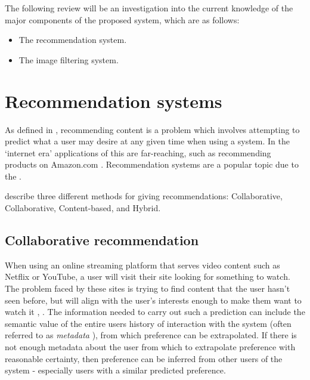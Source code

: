 \documentclass[a4paper,12pt]{report}
\begin{document}
  The following review will be an investigation into the current knowledge of the major components of the proposed system, which are as follows:

  \begin{itemize}
    \item The recommendation system.
    \item The image filtering system.
  \end{itemize}

  \section{Recommendation systems} \label{sec:lit-recc}
    As defined in \cite{ricci2011introduction}, recommending content is a problem which involves attempting to predict what a user may desire at any given time when using a system. In the ‘internet era’ applications of this are far-reaching, such as recommending products on Amazon.com \cite{linden2003amazon}. Recommendation systems are a popular topic due to the  \citep{adomavicius2005toward}.

    \cite{jannach2010recommender} describe three different methods for giving recommendations: Collaborative, Collaborative, Content-based, and Hybrid.

    \subsection{Collaborative recommendation}
      When using an online streaming platform that serves video content such as Netflix or YouTube, a user will visit their site looking for something to watch. The problem faced by these sites is trying to find content that the user hasn't seen before, but will align with the user's interests enough to make them want to watch it \citep{davidson2010youtube}, \citep{gomez2016netflix}.
      The information needed to carry out such a prediction can include the semantic value of the entire users history of interaction with the system (often referred to as \textit{metadata} \citep{duval2002metadata}), from which preference can be extrapolated. If there is not enough metadata about the user from which to extrapolate preference with reasonable certainty, then preference can be inferred from other users of the system - especially users with a similar predicted preference.
\end{document}
